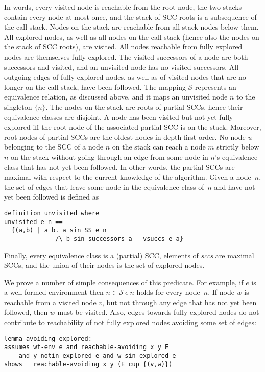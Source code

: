 \documentclass[sigplan,10pt,anonymous,review]{acmart}
\newcommand{\prog}[1]{\textit{#1}}
\renewcommand{\SS}{\mathcal{S}}
\begin{document}
In words, every visited node is reachable from the root node, the two stacks contain every node at most once, and the stack of SCC roots is a subsequence of the call stack. Nodes on the stack are reachable from all stack nodes below them. All explored nodes, as well as all nodes on the call stack (hence also the nodes on the stack of SCC roots), are visited. All nodes reachable from fully explored nodes are themselves fully explored. The visited successors of a node are both successors and visited, and an unvisited node has no visited successors. All outgoing edges of fully explored nodes, as well as of visited nodes that are no longer on the call stack, have been followed. The mapping $\SS$ represents an equivalence relation, as discussed above, and it maps an unvisited node $n$ to the singleton $\{n\}$. The nodes on the stack are roots of partial SCCs, hence their equivalence classes are disjoint. A node has been visited but not yet fully explored iff the root node of the associated partial SCC is on the stack. Moreover, root nodes of partial SCCs are the oldest nodes in depth-first order. No node $u$ belonging to the SCC of a node $n$ on the stack can reach a node $m$ strictly below $n$ on the stack without going through an edge from some node in $n$'s equivalence class that has not yet been followed. In other words, the partial SCCs are maximal with respect to the current knowledge of the algorithm. Given a node~$n$, the set of edges that leave some node in the equivalence class of~$n$ and have not yet been followed is defined as
%
\begin{small}
\begin{lstlisting}[language=isabelle]
definition unvisited where
unvisited e n ==
  {(a,b) | a b. a sin SS e n 
              /\ b sin successors a - vsuccs e a}
\end{lstlisting}
\end{small}
%
Finally, every equivalence class is a (partial) SCC, elements of \prog{sccs} are maximal SCCs, and the union of their nodes is the set of explored nodes.

We prove a number of simple consequences of this predicate. For example, if $e$ is a well-formed environment then $n \in \SS~e~n$ holds for every node~$n$. If node $w$ is reachable from a visited node $v$, but not through any edge that has not yet been followed, then $w$ must be visited. Also, edges towards fully explored nodes do not contribute to reachability of not fully explored nodes avoiding some set of edges:
%
\begin{small}
\begin{lstlisting}[language=isabelle]
lemma avoiding-explored:
assumes wf-env e and reachable-avoiding x y E
    and y notin explored e and w sin explored e
shows   reachable-avoiding x y (E cup {(v,w)})
\end{lstlisting}
\end{small}
\end{document}
